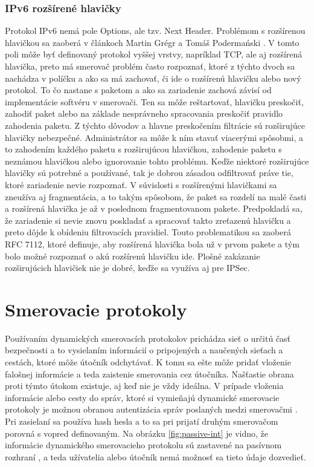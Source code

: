 \subsubsection*{IPv6 rozšírené hlavičky}
Protokol IPv6 nemá pole Options, ale tzv. Next Header. Problémom s rozšírenou hlavičkou sa zaoberá v článkoch Martin Grégr a Tomáš Podermański \cite{Gregr2622015} \cite{Podermanski1922015}. V tomto poli môže byť definovaný protokol vyššej vrstvy, napríklad TCP, ale aj rozšírená hlavička, preto má smerovač problém často rozpoznať, ktoré z týchto dvoch sa nachádza v políčku a ako sa má zachovať, či ide o rozšírenú hlavičku alebo nový protokol. To čo nastane s paketom a ako sa zariadenie zachová závisí od implementácie softvéru v smerovači. Ten sa môže reštartovať, hlavičku preskočiť, zahodiť paket alebo na základe nesprávneho spracovania preskočiť pravidlo zahodenia paketu. Z týchto dôvodov a hlavne preskočením filtrácie sú rozširujúce hlavičky nebezpečné. Administrátor sa môže k ním stavať viacerými spôsobmi, a to zahodením každého paketu s rozširujúcou hlavičkou, zahodenie paketu s neznámou hlavičkou alebo ignorovanie tohto problému. Keďže niektoré rozširujúce hlavičky sú potrebné a používané, tak je dobrou zásadou odfiltrovať práve tie, ktoré zariadenie nevie rozpoznať. V súvislosti s rozšírenými hlavičkami sa zneužíva aj fragmentácia, a to takým spôsobom, že paket sa rozdelí na malé časti a rozšírená hlavička je až v poslednom fragmentovanom pakete. Predpokladá sa, že zariadenie si nevie znovu poskladať a spracovať takto zreťazenú hlavičku a preto dôjde k obídeniu filtrovacích pravidiel. Touto problematikou sa zaoberá RFC 7112, ktoré definuje, aby rozšírená hlavička bola už v prvom pakete a tým bolo možné rozpoznať o akú rozšírenú hlavičku ide. Plošné zakázanie rozširujúcich hlavičiek nie je dobré, keďže sa využíva aj pre IPSec.

\section*{Smerovacie protokoly}
Používaním dynamických smerovacích protokolov prichádza sieť o určitú časť bezpečnosti a to vysielaním informácií o pripojených a naučených sieťach a cestách, ktoré môže útočník odchytávať. K tomu sa ešte môže pridať vloženie falošnej informácie a teda zaistenie smerovania cez útočníka. Našťastie obrana proti týmto útokom existuje, aj keď nie je vždy ideálna. V prípade vloženia informácie alebo cesty do správ, ktoré si vymieňajú dynamické smerovacie protokoly je možnou obranou autentizácia správ poslaných medzi smerovačmi \cite{McMillan2018} \cite{Singh2018} \cite{CIS_DrTLsgXv24lxeIIM}. Pri zasielaní sa používa hash hesla a to sa pri prijatí druhým smerovačom porovná s vopred definovaným. Na obrázku \ref{fig:passive-int} je vidno, že informácie dynamického smerovacieho protokolu sú zastavené na pasívnom rozhraní \cite{Khandelwal2016}, a teda užívatelia alebo útočník nemá možnosť sa tieto údaje dozvedieť.

